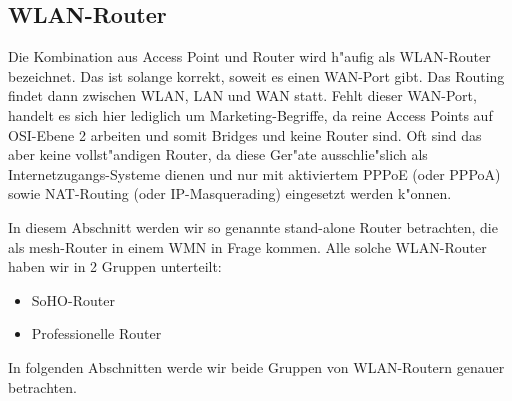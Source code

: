 \newpage

\subsection{WLAN-Router}

Die Kombination aus Access Point und Router wird h"aufig als WLAN-Router
bezeichnet. Das ist solange korrekt, soweit es einen WAN-Port gibt. Das
Routing findet dann zwischen WLAN, LAN und WAN statt. Fehlt dieser
WAN-Port, handelt es sich hier lediglich um Marketing-Begriffe, da reine
Access Points auf OSI-Ebene 2 arbeiten und somit Bridges und keine
Router sind. Oft sind das aber keine vollst"andigen Router, da diese
Ger"ate ausschlie"slich als Internetzugangs-Systeme dienen und nur mit
aktiviertem PPPoE (oder PPPoA) sowie NAT-Routing (oder IP-Masquerading)
eingesetzt werden k"onnen.

In diesem Abschnitt werden wir so genannte stand-alone Router
betrachten, die als mesh-Router in einem WMN in Frage kommen.
Alle solche WLAN-Router haben wir in 2 Gruppen unterteilt:

\begin{itemize}
\item SoHO-Router
\item Professionelle Router
\end{itemize}

In folgenden Abschnitten werde wir beide Gruppen von WLAN-Routern genauer
betrachten.



